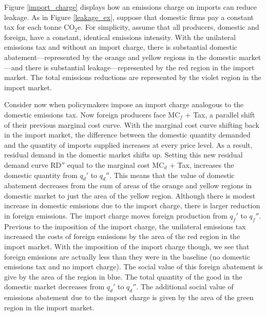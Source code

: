 Figure \ref{import_charge} displays how an emissions charge on imports can reduce leakage. As in Figure \ref{leakage_ex}, suppose that domestic firms pay a constant tax for each tonne CO$_2$e. For simplicity, assume that all producers, domestic and foreign, have a constant, identical emissions intensity. With the unilateral emissions tax and without an import charge, there is substantial domestic abatement---represented by the orange and yellow regions in the domestic market---and there is substantial leakage---represented by the red region in the import market. The total emissions reductions are represented by the violet region in the import market. 

Consider now when policymakers impose an import charge analogous to the domestic emissions tax. Now foreign producers face MC$_f$ $+$ Tax, a parallel shift of their previous marginal cost curve. With the marginal cost curve shifting back in the import market, the difference between the domestic quantity demanded and the quantity of imports supplied increases at every price level. As a result, residual demand in the domestic market shifts up. Setting this new residual demand curve RD$''$ equal to the marginal cost MC$_d$ $+$ Tax, increases the domestic quantity from $q_d'$ to $q_d''$. This means that the value of domestic abatement decreases from the sum of areas of the orange and yellow regions in domestic market to just the area of the yellow region. Although there is modest increase in domestic emissions due to the import charge, there is larger reduction in foreign emissions. The import charge moves foreign production from $q_f'$ to $q_f''$. Previous to the imposition of the import charge, the unilateral emissions tax increased the costs of foreign emissions by the area of the red region in the import market. With the imposition of the import charge though, we see that foreign emissions are actually less than they were in the baseline (no domestic emissions tax and no import charge). The social value of this foreign abatement is give by the area of the region in blue. The total quantity of the good in the domestic market decreases from $q_d'$ to $q_d''$. The additional social value of emissions abatement due to the import charge is given by the area of the green region in the import market.

